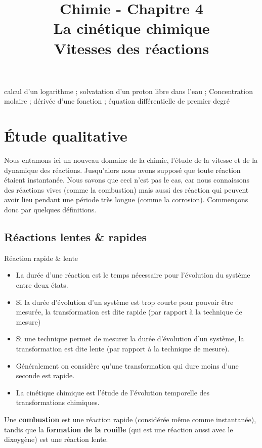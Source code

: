 \documentclass[11pt,a4paper]{article}
\title{\large Chimie - Chapitre 4 \\ \LARGE La cinétique chimique \\ \small Vitesses des réactions}
\date{}
\author{}
\begin{document}
\maketitle
\vspace{-2cm}
\begin{tcolorbox}[title=Notions de la classe de première à rappeler]
calcul d'un logarithme ; solvatation d'un proton libre dans l'eau ; Concentration molaire ; dérivée d'une fonction ; équation différentielle de premier degré 
\end{tcolorbox}
\vspace{1cm}
\tableofcontents
\vspace{1cm}
\section{Étude qualitative}

Nous entamons ici un nouveau domaine de la chimie, l'étude de la vitesse et de la dynamique des réactions. Jusqu'alors nous avons supposé que toute réaction étaient instantanée. Nous savons que ceci n'est pas le cas, car nous connaissons des réactions vives (comme la combustion) mais aussi des réaction qui peuvent avoir lieu pendant une période très longue (comme la corrosion). Commençons donc par quelques définitions. 

\subsection{Réactions lentes \& rapides}
\begin{defn}{Réaction rapide \& lente}
\begin{itemize}
    \item La durée d’une réaction est le temps nécessaire pour l’évolution du système entre deux états. 
    \item Si la durée d’évolution d’un système est trop courte pour pouvoir être mesurée, la transformation est dite rapide (par rapport à la technique de mesure)
    \item Si une technique permet de mesurer la durée d’évolution d’un système, la transformation est dite lente (par rapport à la technique de mesure). 
    \item Généralement on considère qu’une transformation qui dure moins d’une seconde est rapide. 
    \item La cinétique chimique est l’étude de l’évolution temporelle des transformations chimiques. 
\end{itemize}
\end{defn}
\begin{eg}

Une \textbf{combustion} est une réaction rapide (considérée même comme instantanée), tandis que la \textbf{formation de la rouille} (qui est une réaction aussi avec le dixoygène) est une réaction lente. 
\end{eg}
\end{document}
